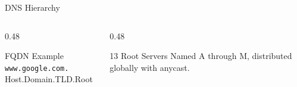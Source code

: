\documentclass[aspectratio=169]{beamer}  %
\begin{document}
\begin{frame}{DNS Hierarchy}
    \vspace{0.2em}
    \begin{columns}[T]
        \begin{column}{0.48\textwidth}
            \begin{block}{FQDN Example}
                \small
                \texttt{www.google.com.} \\
                \footnotesize
                Host.Domain.TLD.Root
            \end{block}
        \end{column}
        \begin{column}{0.48\textwidth}
            \begin{exampleblock}{13 Root Servers}
                \small
                Named A through M, distributed globally with anycast.
            \end{exampleblock}
        \end{column}
    \end{columns}
\end{frame}
\end{document}
